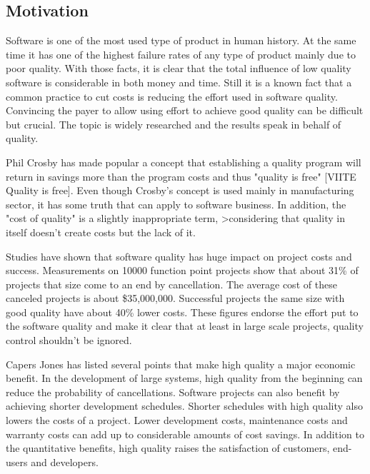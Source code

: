 


\subsection{Motivation}

Software is one of the most used type of product in human history. At the same time it has one of the highest failure rates of any type of product mainly due to poor quality. With those facts, it is clear that the total influence of low quality software is considerable in both money and time. Still it is a known fact that a common practice to cut costs is reducing the effort used in software quality. Convincing the payer to allow using effort to achieve good quality can be difficult but crucial. The topic is widely researched and the results speak in behalf of quality.

Phil Crosby has made popular a concept that establishing a quality program will return in savings more than the program costs and thus "quality is free" [VIITE Quality is free]. Even though Crosby's concept is used mainly in manufacturing sector, it has some truth that can apply to software business.  In addition, the "cost of quality" is a slightly inappropriate term, >considering that quality in itself doesn't create costs but the lack of it. 

Studies have shown that software quality has huge impact on project costs and success. Measurements on 10000 function point projects show that about 31\% of projects that size come to an end by cancellation. The average cost of these canceled projects is about \$35,000,000. Successful projects the same size with good quality have about 40\% lower costs. These figures endorse the effort put to the software quality and make it clear that at least in large scale projects, quality control shouldn't be ignored.

Capers Jones has listed several points that make high quality a major economic benefit. In the development of large systems, high quality from the beginning can reduce the probability of cancellations. Software projects can also benefit by achieving shorter development schedules. Shorter schedules with high quality also lowers the costs of a project. Lower development costs, maintenance costs and warranty costs can add up to considerable amounts of cost savings. In addition to the quantitative benefits, high quality raises the satisfaction of customers, end-users and developers. 

